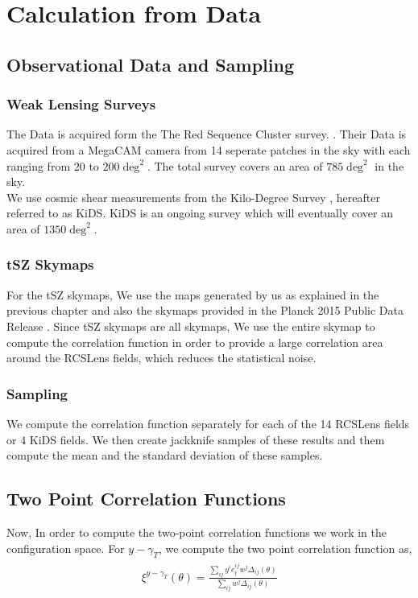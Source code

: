 \section{Calculation from Data}
\subsection{Observational Data and Sampling}
\subsubsection{Weak Lensing Surveys}
The Data is acquired form the The Red Sequence Cluster survey.
\cite{rcslens}. Their Data is acquired from a MegaCAM camera from
14 seperate patches in the sky with each ranging from
$20$ to $200 \deg^2$. The total survey covers an area of $785\deg^2$ in the sky.
\\
We use cosmic shear measurements from the Kilo-Degree Survey
\cite{kids1, kids2, kids3}, hereafter referred to as KiDS. KiDS is an 
ongoing survey which will eventually cover an area of $1350\deg^2$. 


\subsubsection{tSZ Skymaps}
For the tSZ skymaps, We use the maps generated by us as explained in the 
previous chapter and also the skymaps provided in the Planck 2015 Public 
Data Release \cite{plancksz}. Since tSZ skymaps are all skymaps, We use 
the entire skymap to compute the correlation function in order to provide 
a large correlation area around the RCSLens fields, which reduces the statistical 
noise. 


\subsubsection{Sampling}
We compute the correlation function separately for each of the 14 RCSLens fields or 4 KiDS fields. We then create jackknife samples of these results 
and them compute the mean and the standard deviation of these samples.

\subsection{Two Point Correlation Functions}
Now, In order to compute the two-point correlation functions 
we work in the configuration space.
For $y-\gamma_T$, we compute the two point correlation function as, 
\begin{align}
  \begin{split}
    \xi^{y - \gamma_T}(\theta) = \frac{\sum\limits_{ij} y^i e^{ij}_t w^j \Delta_{ij}(\theta)}{\sum\limits_{ij} w^j \Delta_{ij}(\theta)}
  \end{split}
\end{align}

